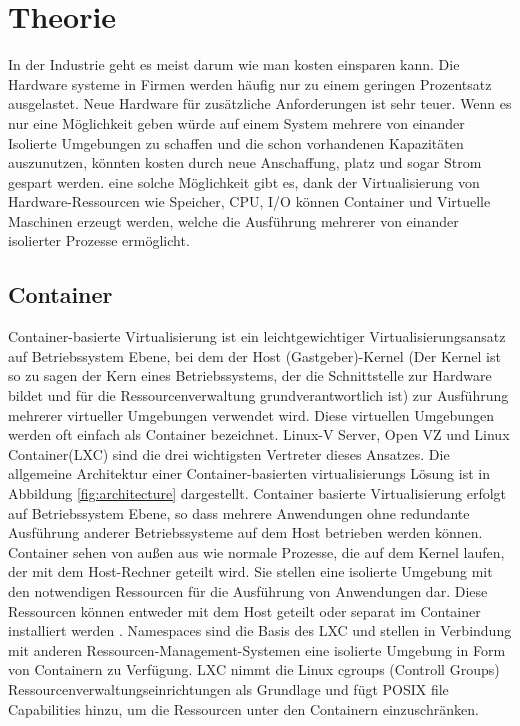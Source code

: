 \thispagestyle{empty}

\section{Theorie}

In der Industrie geht es meist darum wie man kosten einsparen kann. Die Hardware systeme in Firmen werden häufig nur zu einem geringen Prozentsatz ausgelastet. Neue Hardware für zusätzliche Anforderungen ist sehr teuer. Wenn es nur eine Möglichkeit geben würde auf einem System mehrere von einander Isolierte Umgebungen zu schaffen und die schon vorhandenen Kapazitäten auszunutzen, könnten kosten durch neue Anschaffung, platz und sogar Strom gespart werden. eine solche Möglichkeit gibt es, dank der Virtualisierung von Hardware-Ressourcen wie Speicher, CPU, I/O können Container und Virtuelle Maschinen erzeugt werden, welche die Ausführung mehrerer von einander isolierter Prozesse ermöglicht.

\pagebreak

\subsection{Container}
Container-basierte Virtualisierung ist ein leichtgewichtiger Virtualisierungsansatz auf Betriebssystem Ebene, bei dem der Host (Gastgeber)-Kernel (Der Kernel ist so zu sagen der Kern eines Betriebssystems, der die Schnittstelle zur Hardware bildet und für die Ressourcenverwaltung grundverantwortlich ist) zur Ausführung mehrerer virtueller Umgebungen verwendet wird. Diese virtuellen Umgebungen werden oft einfach als \glqq Container \grqq{} bezeichnet. Linux-V Server\cite{Overview2018PaperLinux-VServer}, Open VZ\cite{IndexOpenvz.org} und Linux Container(LXC)\cite{IndexLinuxcontainers.Org} sind die drei wichtigsten Vertreter dieses Ansatzes. Die allgemeine Architektur einer Container-basierten virtualisierungs Lösung ist in Abbildung \ref{fig:architecture} dargestellt. Container basierte Virtualisierung erfolgt auf Betriebssystem Ebene, so dass mehrere Anwendungen ohne redundante Ausführung anderer Betriebssysteme auf dem Host betrieben werden können. Container sehen von außen aus wie normale Prozesse, die auf dem Kernel laufen, der mit dem Host-Rechner geteilt wird. Sie stellen eine isolierte Umgebung mit den notwendigen Ressourcen für die Ausführung von Anwendungen dar. Diese Ressourcen können entweder mit dem Host geteilt oder separat im Container installiert werden \cite{Xavier2014AClusters}. Namespaces sind die Basis des LXC und stellen in Verbindung mit anderen Ressourcen-Management-Systemen eine isolierte Umgebung in Form von Containern zu Verfügung. LXC nimmt die Linux cgroups (Controll Groups) Ressourcenverwaltungseinrichtungen\cite{Heo2015ControlV2} als Grundlage und fügt POSIX file Capabilities\cite{Overview2018PaperLinux-VServer} hinzu, um die Ressourcen unter den Containern einzuschränken. 


